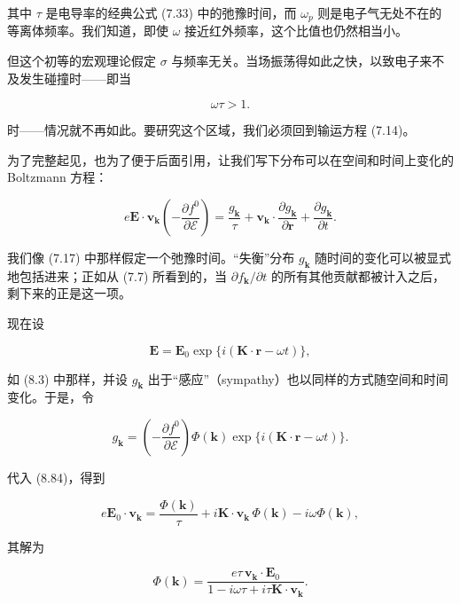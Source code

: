 其中 $\tau$ 是电导率的经典公式 (7.33) 中的弛豫时间，而 $\omega_p$ 则是电子气无处不在的等离体频率。我们知道，即使 $\omega$ 接近红外频率，这个比值也仍然相当小。

但这个初等的宏观理论假定 $\sigma$ 与频率无关。当场振荡得如此之快，以致电子来不及发生碰撞时——即当

\begin{equation*}
\omega\tau > 1.
\tag{8.83}
\end{equation*}

时——情况就不再如此。要研究这个区域，我们必须回到输运方程 (7.14)。

为了完整起见，也为了便于后面引用，让我们写下分布可以在空间和时间上变化的 Boltzmann 方程：

\begin{equation*}
e\mathbf{E}\cdot\mathbf{v}_{\mathbf{k}}\left(-\frac{\partial f^0}{\partial\mathcal{E}}\right) = \frac{g_{\mathbf{k}}}{\tau} + \mathbf{v}_{\mathbf{k}}\cdot\frac{\partial g_{\mathbf{k}}}{\partial\mathbf{r}} + \frac{\partial g_{\mathbf{k}}}{\partial t}.
\tag{8.84}
\end{equation*}

我们像 (7.17) 中那样假定一个弛豫时间。“失衡”分布 $g_{\mathbf{k}}$ 随时间的变化可以被显式地包括进来；正如从 (7.7) 所看到的，当 $\partial f_{\mathbf{k}}/\partial t$ 的所有其他贡献都被计入之后，剩下来的正是这一项。

现在设

\begin{equation*}
\mathbf{E} = \mathbf{E}_0\exp\{i(\mathbf{K}\cdot\mathbf{r}-\omega t)\},
\tag{8.85}
\end{equation*}

如 (8.3) 中那样，并设 $g_{\mathbf{k}}$ 出于“感应”（sympathy）也以同样的方式随空间和时间变化。于是，令

\begin{equation*}
g_{\mathbf{k}} = \left(-\frac{\partial f^0}{\partial\mathcal{E}}\right)\Phi(\mathbf{k})\exp\{i(\mathbf{K}\cdot\mathbf{r}-\omega t)\}.
\tag{8.86}
\end{equation*}

代入 (8.84)，得到

\begin{equation*}
e\mathbf{E}_0\cdot\mathbf{v}_{\mathbf{k}} = \frac{\Phi(\mathbf{k})}{\tau} + i\mathbf{K}\cdot\mathbf{v}_{\mathbf{k}}\,\Phi(\mathbf{k}) - i\omega\Phi(\mathbf{k}),
\tag{8.87}
\end{equation*}

其解为

\begin{equation*}
\Phi(\mathbf{k}) = \frac{e\tau\,\mathbf{v}_{\mathbf{k}}\cdot\mathbf{E}_0}{1-i\omega\tau+i\tau\mathbf{K}\cdot\mathbf{v}_{\mathbf{k}}}.
\tag{8.88}
\end{equation*}

